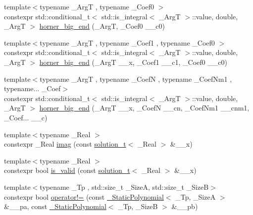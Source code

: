 \begin{DoxyCompactItemize}
\item 
{\footnotesize template$<$typename \+\_\+\+ArgT , typename \+\_\+\+Coef0 $>$ }\\constexpr std\+::conditional\+\_\+t$<$ std\+::is\+\_\+integral$<$ \+\_\+\+ArgT $>$\+::value, double, \+\_\+\+ArgT $>$ \hyperlink{namespace____gnu__cxx_af87123557fba351af5069ed8d1b99ec1}{horner\+\_\+big\+\_\+end} (\+\_\+\+ArgT, \+\_\+\+Coef0 \+\_\+\+\_\+c0)
\item 
{\footnotesize template$<$typename \+\_\+\+ArgT , typename \+\_\+\+Coef1 , typename \+\_\+\+Coef0 $>$ }\\constexpr std\+::conditional\+\_\+t$<$ std\+::is\+\_\+integral$<$ \+\_\+\+ArgT $>$\+::value, double, \+\_\+\+ArgT $>$ \hyperlink{namespace____gnu__cxx_a546a72f007105e3ba32df87d7463edf7}{horner\+\_\+big\+\_\+end} (\+\_\+\+ArgT \+\_\+\+\_\+x, \+\_\+\+Coef1 \+\_\+\+\_\+c1, \+\_\+\+Coef0 \+\_\+\+\_\+c0)
\item 
{\footnotesize template$<$typename \+\_\+\+ArgT , typename \+\_\+\+CoefN , typename \+\_\+\+Coef\+Nm1 , typename... \+\_\+\+Coef$>$ }\\constexpr std\+::conditional\+\_\+t$<$ std\+::is\+\_\+integral$<$ \+\_\+\+ArgT $>$\+::value, double, \+\_\+\+ArgT $>$ \hyperlink{namespace____gnu__cxx_afda9e3a1e351db85a89d4e6434576159}{horner\+\_\+big\+\_\+end} (\+\_\+\+ArgT \+\_\+\+\_\+x, \+\_\+\+CoefN \+\_\+\+\_\+cn, \+\_\+\+Coef\+Nm1 \+\_\+\+\_\+cnm1, \+\_\+\+Coef... \+\_\+\+\_\+c)
\item 
{\footnotesize template$<$typename \+\_\+\+Real $>$ }\\constexpr \+\_\+\+Real \hyperlink{namespace____gnu__cxx_a685dd0477f8454431bcfb404fa201c57}{imag} (const \hyperlink{namespace____gnu__cxx_ae20ea642de50eb361074c62676b0159c}{solution\+\_\+t}$<$ \+\_\+\+Real $>$ \&\+\_\+\+\_\+x)
\item 
{\footnotesize template$<$typename \+\_\+\+Real $>$ }\\constexpr bool \hyperlink{namespace____gnu__cxx_ac6649e26a3db551b4f945ccfcd3ce0a7}{is\+\_\+valid} (const \hyperlink{namespace____gnu__cxx_ae20ea642de50eb361074c62676b0159c}{solution\+\_\+t}$<$ \+\_\+\+Real $>$ \&\+\_\+\+\_\+x)
\item 
{\footnotesize template$<$typename \+\_\+\+Tp , std\+::size\+\_\+t \+\_\+\+SizeA, std\+::size\+\_\+t \+\_\+\+SizeB$>$ }\\constexpr bool \hyperlink{namespace____gnu__cxx_af19ad85b9b29562d2e134f3db6b3a651}{operator!=} (const \hyperlink{class____gnu__cxx_1_1__StaticPolynomial}{\+\_\+\+Static\+Polynomial}$<$ \+\_\+\+Tp, \+\_\+\+SizeA $>$ \&\+\_\+\+\_\+pa, const \hyperlink{class____gnu__cxx_1_1__StaticPolynomial}{\+\_\+\+Static\+Polynomial}$<$ \+\_\+\+Tp, \+\_\+\+SizeB $>$ \&\+\_\+\+\_\+pb)

\end{DoxyCompactItemize}
